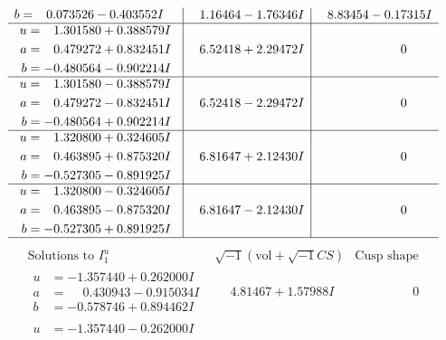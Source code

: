 \documentclass[1p]{elsarticle_modified}
\theoremstyle{definition}
\newcommand{\I}{\sqrt{-1}}
\begin{document}
$$\begin{array}{c|c|c}
\begin{aligned}
b &= \phantom{-}0.073526 - 0.403552 I\end{aligned}
 & \phantom{-}1.16464 - 1.76346 I & \phantom{-}8.83454 - 0.17315 I \\ \hline\begin{aligned}
u &= \phantom{-}1.301580 + 0.388579 I \\
a &= \phantom{-}0.479272 + 0.832451 I \\
b &= -0.480564 - 0.902214 I\end{aligned}
 & \phantom{-}6.52418 + 2.29472 I & \phantom{-0.000000 } 0 \\ \hline\begin{aligned}
u &= \phantom{-}1.301580 - 0.388579 I \\
a &= \phantom{-}0.479272 - 0.832451 I \\
b &= -0.480564 + 0.902214 I\end{aligned}
 & \phantom{-}6.52418 - 2.29472 I & \phantom{-0.000000 } 0 \\ \hline\begin{aligned}
u &= \phantom{-}1.320800 + 0.324605 I \\
a &= \phantom{-}0.463895 + 0.875320 I \\
b &= -0.527305 - 0.891925 I\end{aligned}
 & \phantom{-}6.81647 + 2.12430 I & \phantom{-0.000000 } 0 \\ \hline\begin{aligned}
u &= \phantom{-}1.320800 - 0.324605 I \\
a &= \phantom{-}0.463895 - 0.875320 I \\
b &= -0.527305 + 0.891925 I\end{aligned}
 & \phantom{-}6.81647 - 2.12430 I & \phantom{-0.000000 } 0\\
 \hline 
 \end{array}$$\newpage$$\begin{array}{c|c|c}  
\text{Solutions to }I^u_{1}& \I (\text{vol} + \sqrt{-1}CS) & \text{Cusp shape}\\
 \hline 
\begin{aligned}
u &= -1.357440 + 0.262000 I \\
a &= \phantom{-}0.430943 - 0.915034 I \\
b &= -0.578746 + 0.894462 I\end{aligned}
 & \phantom{-}4.81467 + 1.57988 I & \phantom{-0.000000 } 0 \\ \hline\begin{aligned}
u &= -1.357440 - 0.262000 I \\

\end{aligned}
\end{array}$$
\end{document}
